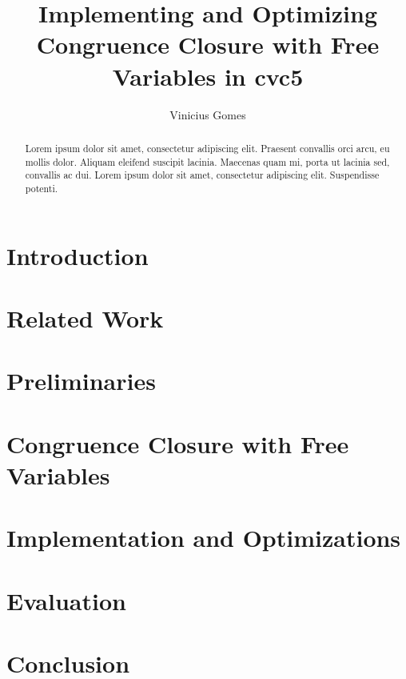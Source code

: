 \documentclass[a4paper,UKenglish,cleveref, autoref, thm-restate]{lipics-v2021}
\title{Implementing and Optimizing Congruence Closure with Free Variables in cvc5} %
\author{Vinicius Gomes}{Universidade Federal de Minas Gerais, Brazil \and \url{https://vinisilvag.github.io} }{vinicius.gomes@dcc.ufmg.br}{https://orcid.org/0009-0009-9819-6649}{}
\begin{document}
\maketitle

\begin{abstract}
  Lorem ipsum dolor sit amet, consectetur adipiscing elit. Praesent convallis orci arcu, eu mollis dolor. Aliquam eleifend suscipit lacinia. Maecenas quam mi, porta ut lacinia sed, convallis ac dui. Lorem ipsum dolor sit amet, consectetur adipiscing elit. Suspendisse potenti.
\end{abstract}

\section{Introduction}\label{sec:introduction}

\section{Related Work}\label{sec:related-work}

\section{Preliminaries}\label{sec:preliminaries}

\section{Congruence Closure with Free Variables}\label{sec:ccfv}

\section{Implementation and Optimizations}\label{sec:implementation-and-optimizations}

\section{Evaluation}\label{sec:evaluation}

\section{Conclusion}\label{sec:conclusion}
\end{document}
